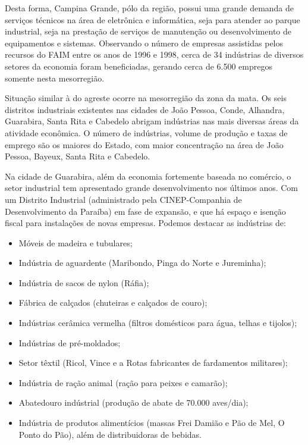 	Desta forma, Campina Grande, pólo da região, possui uma grande demanda de serviços técnicos na área de eletrônica e inform\'atica, seja para atender ao parque industrial, seja na prestação de serviços de manutenção ou desenvolvimento de equipamentos e sistemas. Observando o número de empresas assistidas pelos recursos do FAIM entre os anos de 1996 e 1998, cerca de 34 indústrias de diversos setores da economia foram beneficiadas, gerando cerca de 6.500 empregos somente nesta mesorregião.

	
	Situação similar à do agreste ocorre na mesorregião da zona da mata. Os seis distritos industriais existentes nas cidades de João Pessoa, Conde, Alhandra, Guarabira, Santa Rita e Cabedelo abrigam indústrias nas mais diversas áreas da atividade econômica. O número de indústrias, volume de produção e taxas de emprego são os maiores do Estado, com maior concentração na área de João Pessoa, Bayeux, Santa Rita e Cabedelo.

	Na cidade de Guarabira, além da economia fortemente baseada no comércio, o setor industrial tem apresentado grande desenvolvimento nos últimos anos. Com um Distrito Industrial (administrado pela CINEP-Companhia de Desenvolvimento da Paraíba) em fase de expansão, e que há espaço e isenção fiscal para instalações de novas empresas. Podemos destacar as indústrias de: 

\begin{itemize}

	\item Móveis de madeira e tubulares;
	\item Indústria de aguardente (Maribondo, Pinga do Norte e Jureminha);
	\item Indústria de sacos de nylon (Ráfia); 
	\item Fábrica de calçados (chuteiras e calçados de couro); 
	\item Indústrias cerâmica vermelha (filtros domésticos para água, telhas e tijolos); 
	\item Indústrias de pré-moldados; 
	\item Setor têxtil (Ricol, Vince e a Rotas fabricantes de fardamentos militares); 
	\item Indústria de ração animal (ração para peixes e camarão); 
	\item Abatedouro indústrial (produção de abate de 70.000 aves/dia); 
	\item Ind\'ustria de produtos alimentícios (massas Frei Damião e Pão de Mel, O Ponto do Pão), além de distribuidoras de bebidas.

\end{itemize}
	
